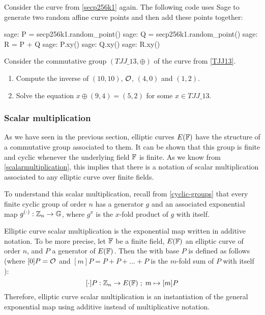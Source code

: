 \begin{example}
Consider the  curve from \examplename{} \ref{secp256k1} again. The following code uses Sage to generate two random affine curve points and then add these points together: 
\begin{sagecommandline}
sage: P = secp256k1.random_point()
sage: Q = secp256k1.random_point()
sage: R = P + Q
sage: P.xy()
sage: Q.xy()
sage: R.xy()
\end{sagecommandline}
\end{example}
\begin{exercise}
Consider the commutative group $(\mathit{TJJ\_13},\oplus)$ of the  curve from \examplename{} \ref{TJJ13}. 
\begin{enumerate}
\item Compute the inverse of $(10,10)$, $\mathcal{O}$, $(4,0)$ and $(1,2)$.
\item Solve the equation $x \oplus (9,4) = (5,2) $ for some $x\in \mathit{TJJ\_13}$.
\end{enumerate}
\end{exercise}

\subsubsection{Scalar multiplication}
As we have seen in the previous section, elliptic curves $E(\mathbb{F})$ have the structure of a commutative group associated to them. It can be shown that this group is finite and cyclic whenever the underlying field $\mathbb{F}$ is finite. As we know from \eqref{scalarmultiplication}, this implies that there is a notation of scalar multiplication associated to any elliptic curve over finite fields.

To understand this scalar multiplication, recall from  \ref{cyclic-groups} that every finite cyclic group of order $n$ has a generator $g$ and an associated exponential map $g^{(\cdot)}: \mathbb{Z}_n \to \mathbb{G}$, where $g^x$ is the $x$-fold product of $g$ with itself.  

Elliptic curve scalar multiplication is the exponential map written in additive notation. To be more precise, let $\mathbb{F}$ be a finite field, $E(\mathbb{F})$ an elliptic curve of order $n$, and $P$ a generator of $E(\mathbb{F})$. Then the  with base $P$ is defined as follows (where $[0]P = \mathcal{O}$ and $[m]P = P+P+\ldots + P$ is the $m$-fold sum of $P$ with itself ):
$$
[\cdot]P: \mathbb{Z}_n \to E(\mathbb{F})\;;\; m \mapsto [m]P
$$
Therefore, elliptic curve scalar multiplication is an instantiation of the general exponential map using additive instead of multiplicative notation.

